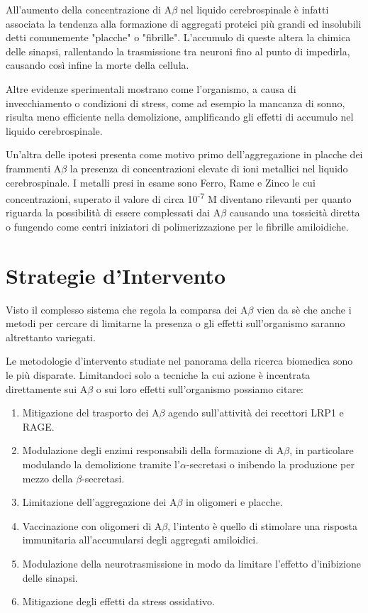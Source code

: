 \documentclass[a4paper, 12pt]{article}
\begin{document}
All'aumento della concentrazione di A$\beta$ nel liquido cerebrospinale è infatti associata la tendenza alla formazione di aggregati proteici più grandi ed insolubili detti comunemente "placche" o "fibrille".
L'accumulo di queste altera la chimica delle sinapsi, rallentando la trasmissione tra neuroni fino al punto di impedirla, causando così infine la morte della cellula.

Altre evidenze sperimentali mostrano come l’organismo, a causa di invecchiamento o condizioni di stress, come ad esempio la mancanza di sonno, risulta meno efficiente nella demolizione, amplificando gli effetti di accumulo nel liquido cerebrospinale.

Un'altra delle ipotesi presenta come motivo primo dell'aggregazione in placche dei frammenti A$\beta$ la presenza di concentrazioni elevate di ioni metallici nel liquido cerebrospinale. I metalli presi in esame sono Ferro, Rame e Zinco le cui concentrazioni, superato il valore di circa 10\textsuperscript{-7}  M diventano rilevanti per quanto riguarda la possibilità di essere complessati dai A$\beta$ causando una tossicità diretta o fungendo come centri iniziatori di polimerizzazione per le fibrille amiloidiche.\cite{kepp_bioinorganic_2012}

\section{Strategie d'Intervento}
Visto il complesso sistema che regola la comparsa dei A$\beta$ vien da sè che anche i metodi per cercare di limitarne la presenza o gli effetti sull'organismo saranno altrettanto variegati.

Le metodologie d'intervento studiate nel panorama della ricerca biomedica sono le più disparate. Limitandoci solo a tecniche la cui azione è incentrata direttamente sui A$\beta$ o sui loro effetti sull'organismo possiamo citare:\cite{kumar_review_2015}
\begin{enumerate}
	\item Mitigazione del trasporto dei A$\beta$ agendo sull'attività dei recettori LRP1 e RAGE.
	\item Modulazione degli enzimi responsabili della formazione di A$\beta$, in particolare modulando la demolizione tramite l'$\alpha$-secretasi o inibendo la produzione per mezzo della $\beta$-secretasi.
	\item Limitazione dell'aggregazione dei A$\beta$ in oligomeri e placche.
	\item Vaccinazione con oligomeri di A$\beta$, l'intento è quello di stimolare una risposta immunitaria all'accumularsi degli aggregati amiloidici.
	\item Modulazione della neurotrasmissione in modo da limitare l'effetto d'inibizione delle sinapsi.
	\item Mitigazione degli effetti da stress ossidativo.
\end{enumerate}
\end{document}
